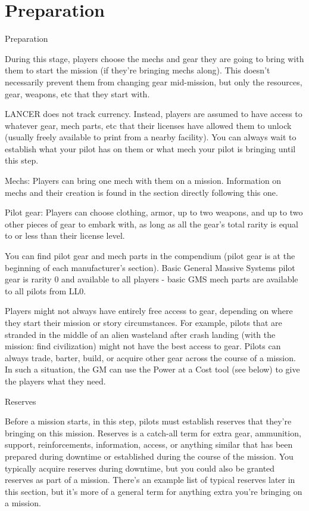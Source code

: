\section{Preparation}
                                                Preparation


During this stage, players choose the mechs and gear they are going to bring with them to start
the mission (if they’re bringing mechs along). This doesn’t necessarily prevent them from
changing gear mid-mission, but only the resources, gear, weapons, etc that they start with.


LANCER does not track currency. Instead, players are assumed to have access to whatever gear,
mech parts, etc that their licenses have allowed them to unlock (usually freely available to print
from a nearby facility). You can always wait to establish what your pilot has on them or what
mech your pilot is bringing until this step.


Mechs: Players can bring one mech with them on a mission. Information on mechs and their
creation is found in the section directly following this one.

Pilot gear: Players can choose clothing, armor, up to two weapons, and up to two other
pieces of gear to embark with, as long as all the gear’s total rarity is equal to or less than their
license level.


You can find pilot gear and mech parts in the compendium (pilot gear is at the beginning of each
manufacturer’s section). Basic General Massive Systems pilot gear is rarity 0 and available to all
players - basic GMS mech parts are available to all pilots from LL0.





Players might not always have entirely free access to gear, depending on where they start their
mission or story circumstances. For example, pilots that are stranded in the middle of an alien
wasteland after crash landing (with the mission: find civilization) might not have the best access
to gear. Pilots can always trade, barter, build, or acquire other gear across the course of a
mission. In such a situation, the GM can use the Power at a Cost tool (see below) to give the
players what they need.


                                                    Reserves


Before a mission starts, in this step, pilots must establish reserves that they’re bringing on this
mission. Reserves is a catch-all term for extra gear, ammunition, support, reinforcements,
information, access, or anything similar that has been prepared during downtime or established
during the course of the mission. You typically acquire reserves during downtime, but you could
also be granted reserves as part of a mission. There’s an example list of typical reserves later in
this section, but it’s more of a general term for anything extra you’re bringing on a mission.

